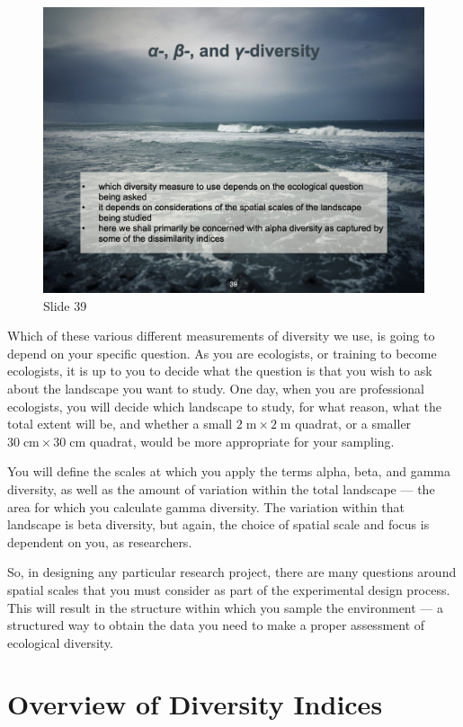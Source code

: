 \documentclass[
  10pt,
]{book}
\begin{document}
\begin{figure}[ht]
\centering
\includegraphics[width=0.8\linewidth]{../images/BDC334/BDC334-039.jpeg}
\caption*{Slide 39}
\end{figure}

Which of these various different measurements of diversity we use, is
going to depend on your specific question. As you are ecologists, or
training to become ecologists, it is up to you to decide what the
question is that you wish to ask about the landscape you want to study.
One day, when you are professional ecologists, you will decide which
landscape to study, for what reason, what the total extent will be, and
whether a small \(2\;\mathrm{m} \times 2\;\mathrm{m}\) quadrat, or a
smaller \(30\;\mathrm{cm} \times 30\;\mathrm{cm}\) quadrat, would be
more appropriate for your sampling.

You will define the scales at which you apply the terms alpha, beta, and
gamma diversity, as well as the amount of variation within the total
landscape --- the area for which you calculate gamma diversity. The
variation within that landscape is beta diversity, but again, the choice
of spatial scale and focus is dependent on you, as researchers.

So, in designing any particular research project, there are many
questions around spatial scales that you must consider as part of the
experimental design process. This will result in the structure within
which you sample the environment --- a structured way to obtain the data
you need to make a proper assessment of ecological diversity.

\section{Overview of Diversity
Indices}\label{overview-of-diversity-indices}
\end{document}
